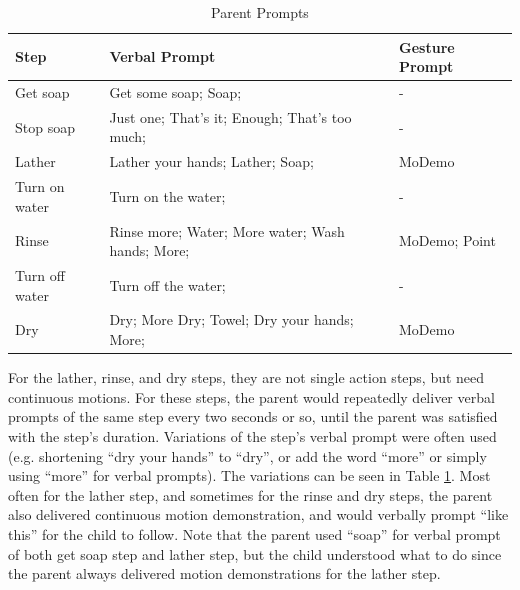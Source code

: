 \documentclass{ut-thesis}
\begin{document}
\begin{table}[H]
	\centering
	\begin{tabular}{ | l | l | l | }
		\hline
		\textbf{Step}	&	\textbf{Verbal Prompt} & \textbf{Gesture Prompt}	\\	\hline	\hline

		Get soap	&	Get some soap; Soap;	&	- 	\\	\hline
		Stop soap	&	Just one; That's it; Enough; That's too much;	&	-	\\ \hline
		Lather	&	Lather your hands; Lather; Soap;	& MoDemo	\\	\hline
		Turn on water	&	Turn on the water;	&	-	\\	\hline
		Rinse	&	Rinse more; Water; More water; Wash hands; More;	&	MoDemo; Point	\\	\hline
		Turn off water	&	Turn off the water;	&	-	\\	\hline
		Dry	&	Dry; More Dry; Towel; Dry your hands; More;	&	MoDemo	\\	\hline

	\end{tabular}
	\caption{Parent Prompts}
	\label{tab:ParentPrompts}
\end{table}

For the lather, rinse, and dry steps, they are not single action steps, but need continuous motions.  For these steps, the parent would repeatedly deliver verbal prompts of the same step every two seconds or so, until the parent was satisfied with the step's duration.  Variations of the step's verbal prompt were often used (e.g. shortening ``dry your hands'' to ``dry'', or add the word ``more'' or simply using ``more'' for verbal prompts).  The variations can be seen in Table \ref{tab:ParentPrompts}.  Most often for the lather step, and sometimes for the rinse and dry steps, the parent also delivered continuous motion demonstration, and would verbally prompt ``like this'' for the child to follow.  Note that the parent used ``soap'' for verbal prompt of both get soap step and lather step, but the child understood what to do since the parent always delivered motion demonstrations for the lather step.
\end{document}

